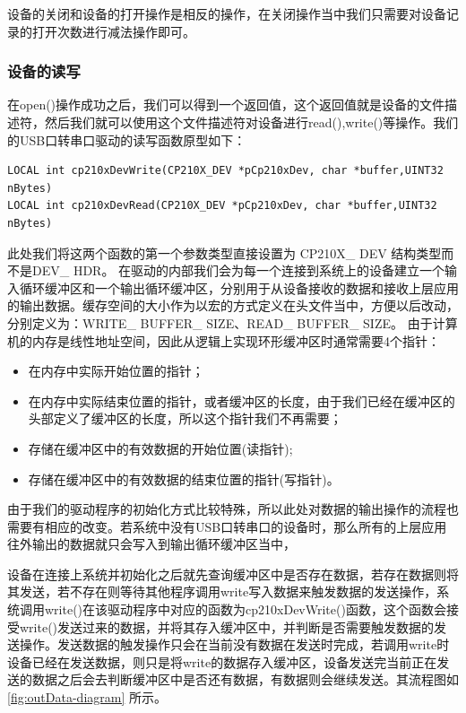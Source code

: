 	设备的关闭和设备的打开操作是相反的操作，在关闭操作当中我们只需要对设备记录的打开次数进行减法操作即可。

\subsubsection{设备的读写}
	在open()操作成功之后，我们可以得到一个返回值，这个返回值就是设备的文件描述符，然后我们就可以使用这个文件描述符对设备进行read(),write()等操作。我们的USB口转串口驱动的读写函数原型如下：

\lstset{language=C}
\begin{lstlisting}
LOCAL int cp210xDevWrite(CP210X_DEV *pCp210xDev, char *buffer,UINT32 nBytes)
LOCAL int cp210xDevRead(CP210X_DEV *pCp210xDev, char *buffer,UINT32 nBytes)
\end{lstlisting}

此处我们将这两个函数的第一个参数类型直接设置为 CP210X\_ DEV 结构类型而不是DEV\_ HDR。
	在驱动的内部我们会为每一个连接到系统上的设备建立一个输入循环缓冲区和一个输出循环缓冲区，分别用于从设备接收的数据和接收上层应用的输出数据。缓存空间的大小作为以宏的方式定义在头文件当中，方便以后改动，分别定义为：WRITE\_ BUFFER\_ SIZE、READ\_ BUFFER\_ SIZE。
	由于计算机的内存是线性地址空间，因此从逻辑上实现环形缓冲区时通常需要4个指针：
	 \begin{itemize}
	 \item 在内存中实际开始位置的指针；
	 \item 在内存中实际结束位置的指针，或者缓冲区的长度，由于我们已经在缓冲区的头部定义了缓冲区的长度，所以这个指针我们不再需要；
	 \item 存储在缓冲区中的有效数据的开始位置(读指针);
	 \item 存储在缓冲区中的有效数据的结束位置的指针(写指针)。
	 \end{itemize}
	
由于我们的驱动程序的初始化方式比较特殊，所以此处对数据的输出操作的流程也需要有相应的改变。若系统中没有USB口转串口的设备时，那么所有的上层应用往外输出的数据就只会写入到输出循环缓冲区当中，
	
	设备在连接上系统并初始化之后就先查询缓冲区中是否存在数据，若存在数据则将其发送，若不存在则等待其他程序调用write写入数据来触发数据的发送操作，系统调用write()在该驱动程序中对应的函数为cp210xDevWrite()函数，这个函数会接受write()发送过来的数据，并将其存入缓冲区中，并判断是否需要触发数据的发送操作。发送数据的触发操作只会在当前没有数据在发送时完成，若调用write时设备已经在发送数据，则只是将write的数据存入缓冲区，设备发送完当前正在发送的数据之后会去判断缓冲区中是否还有数据，有数据则会继续发送。其流程图如\autoref{fig:outData-diagram} 所示。

